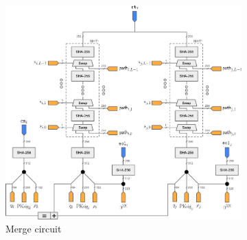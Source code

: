 \begin{figure}
\begin{subfigure}[b]{0.35\textwidth}
    \end{subfigure}
    \hfill
    \begin{subfigure}[t]{0.60\textwidth}  %
        \centering
        \includegraphics[scale=0.6]{Figures/Merge.pdf} %
        \caption{\textsf{Merge} circuit}
        \label{fig:Mergecircuits}
    \end{subfigure}
    \hfill\vspace{5mm}
    \begin{subfigure}[t]{0.35\textwidth}  %
        \centering

\end{subfigure}
\end{figure}
